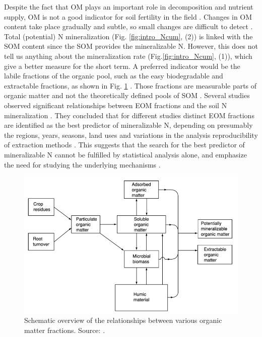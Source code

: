 \documentclass[10pt,twoside,dutch,english]{report}
\begin{document}
Despite the fact that OM plays an important role in decomposition and nutrient supply, OM is not a good indicator for soil fertility in the field \citep{Hanegraaf2009}. Changes in OM content take place gradually and subtle, so small changes are difficult to detect \citep{Ghani2002, Hanegraaf2009}. Total (potential) N mineralization (Fig. \ref{fig:intro_Ncum}, (2)) is linked with the SOM content since the SOM provides the mineralizable N. However, this does not tell us anything about the mineralization rate (Fig.\ref{fig:intro_Ncum}, (1)), which give a better measure for the short term.  A preferred indicator would be the labile fractions of the organic pool, such as the easy biodegradable and extractable fractions, as shown in Fig. \ref{fig:intro_haynes} \citep{Haynes2005}. Those fractions are measurable parts of organic matter and not the theoretically defined pools of SOM \citep{Wander2004}. Several studies observed significant relationships between EOM fractions and the soil N mineralization \citep{Ros2011a,Ros2012}.  They concluded that for different studies distinct EOM fractions are identified as the best predictor of mineralizable N, depending on presumably the regions, years, seasons, land uses and variations in the analysis reproducibility of extraction methods \citep{Ros2011}. This suggests that the search for the best predictor of mineralizable N cannot be fulfilled by statistical analysis alone, and emphasize the need for studying the underlying mechanisms \citep{Ros2011}. 

	\begin{figure}[h]
		\includegraphics[width=1\linewidth]{intro_haynes}
		\caption{Schematic overview of the relationships between various organic matter fractions. Source: \citet{Haynes2005}.}
		\label{fig:intro_haynes}
	\end{figure}
\end{document}
